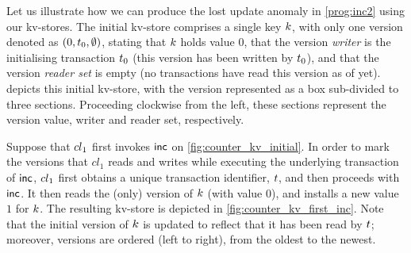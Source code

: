 
Let us illustrate how we can produce the lost update anomaly in \eqref{prog:inc2} using our kv-stores. 
The initial kv-store comprises a single key $k$, with only one 
version denoted as $(0, t_{0}, \emptyset)$, stating that $k$ holds value $0$, 
that the version \emph{writer} is the initialising transaction $t_0$ (this version has been written by $t_0$), 
and that the version \emph{reader set} is empty (no transactions have read this version as of yet). 
 depicts this initial kv-store, with the version
represented as a box sub-divided to three sections. 
Proceeding clockwise from the left, these sections represent the version value, writer and reader set, respectively.

Suppose that ${cl}_1$ first invokes $\mathsf{inc}$ on \cref{fig:counter_kv_initial}. 
In order to mark the versions that $cl_1$ reads and writes while executing the underlying transaction of $\mathsf{inc}$,  
${cl}_1$ first obtains a unique transaction identifier, $t$, 
and then proceeds with $\mathsf{inc}$. 
It then reads the (only) version of $k$ (with value $0$), 
and installs a new value $1$ for $k$. 
The resulting kv-store is depicted in \cref{fig:counter_kv_first_inc}.
Note that the initial version of $k$ is updated to reflect that it has been read by $t$; 
moreover, versions are ordered (left to right), from the oldest to the newest.

